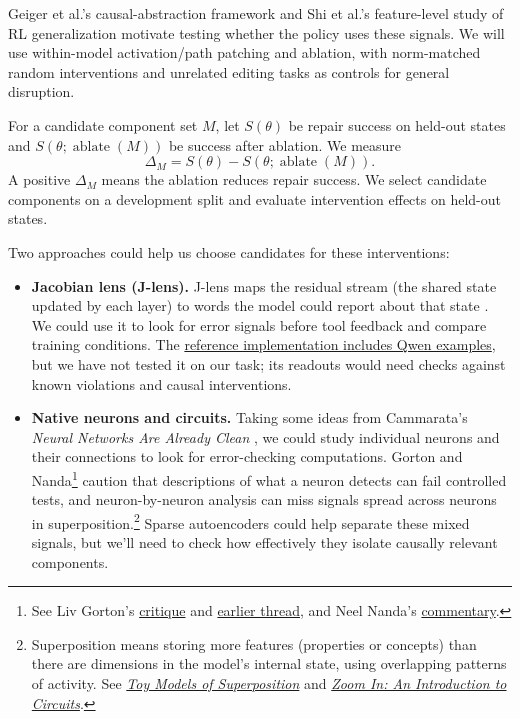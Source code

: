 \documentclass[11pt]{article}
\begin{document}
Geiger et al.'s causal-abstraction framework \cite{geiger2025causal} and Shi et al.'s feature-level study of RL generalization \cite{shi2026generalize} motivate testing whether the policy uses these signals. We will use within-model activation/path patching and ablation, with norm-matched random interventions and unrelated editing tasks as controls for general disruption.

For a candidate component set $M$, let $S(\theta)$ be repair success on held-out states and $S(\theta;\operatorname{ablate}(M))$ be success after ablation. We measure
\begin{equation}
  \Delta_M=S(\theta)-S(\theta;\operatorname{ablate}(M)). \label{eq:intervention}
\end{equation}
A positive $\Delta_M$ means the ablation reduces repair success. We select candidate components on a development split and evaluate intervention effects on held-out states.

Two approaches could help us choose candidates for these interventions:
\begin{itemize}\setlength{\itemsep}{0pt}\setlength{\parskip}{0pt}
  \item \textbf{Jacobian lens (J-lens).} J-lens maps the residual stream (the shared state updated by each layer) to words the model could report about that state \cite{gurnee2026workspace}. We could use it to look for error signals before tool feedback and compare training conditions. The \href{https://github.com/anthropics/jacobian-lens}{reference implementation includes Qwen examples}, but we have not tested it on our task; its readouts would need checks against known violations and causal interventions.

  \item \textbf{Native neurons and circuits.} Taking some ideas from Cammarata's \emph{Neural Networks Are Already Clean} \cite{cammarata2026clean}, we could study individual neurons and their connections to look for error-checking computations. Gorton and Nanda\footnote{See Liv Gorton's \href{https://livgorton.com/already-clean-thoughts/}{critique} and \href{https://x.com/livgorton/status/2110799624667795624}{earlier thread}, and Neel Nanda's \href{https://x.com/NeelNanda5/status/2110875974296654062}{commentary}.} caution that descriptions of what a neuron detects can fail controlled tests, and neuron-by-neuron analysis can miss signals spread across neurons in superposition.\footnote{Superposition means storing more features (properties or concepts) than there are dimensions in the model's internal state, using overlapping patterns of activity. See \href{https://transformer-circuits.pub/2022/toy_model/index.html}{\emph{Toy Models of Superposition}} and \href{https://distill.pub/2020/circuits/zoom-in/\#claim-2-superposition}{\emph{Zoom In: An Introduction to Circuits}}.} Sparse autoencoders could help separate these mixed signals, but we'll need to check how effectively they isolate causally relevant components.
\end{itemize}
\end{document}
